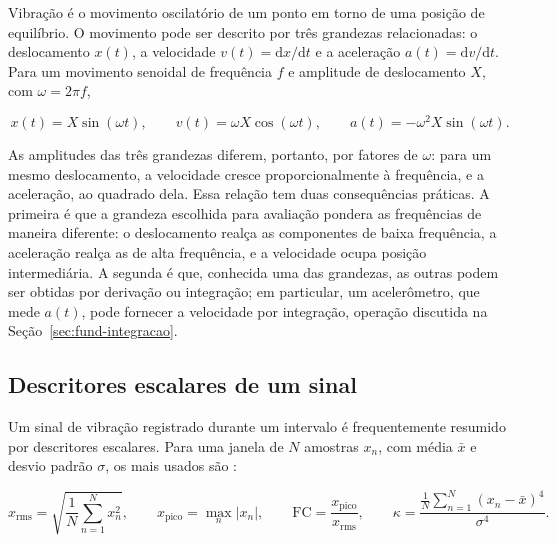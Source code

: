 Vibração é o movimento oscilatório de um ponto em torno de uma posição de equilíbrio. O
movimento pode ser descrito por três grandezas relacionadas: o deslocamento $x(t)$, a
velocidade $v(t) = \mathrm{d}x/\mathrm{d}t$ e a aceleração $a(t) = \mathrm{d}v/\mathrm{d}t$.
Para um movimento senoidal de frequência $f$ e amplitude de deslocamento $X$, com
$\omega = 2\pi f$,

\begin{equation}
x(t) = X \sin(\omega t), \qquad
v(t) = \omega X \cos(\omega t), \qquad
a(t) = -\omega^2 X \sin(\omega t).
\label{eq:fund-senoide}
\end{equation}

As amplitudes das três grandezas diferem, portanto, por fatores de $\omega$: para um mesmo
deslocamento, a velocidade cresce proporcionalmente à frequência, e a aceleração, ao
quadrado dela. Essa relação tem duas consequências práticas. A primeira é que a grandeza
escolhida para avaliação pondera as frequências de maneira diferente: o deslocamento
realça as componentes de baixa frequência, a aceleração realça as de alta frequência, e a
velocidade ocupa posição intermediária. A segunda é que, conhecida uma das grandezas, as
outras podem ser obtidas por derivação ou integração; em particular, um acelerômetro, que
mede $a(t)$, pode fornecer a velocidade por integração, operação discutida na
Seção~\ref{sec:fund-integracao}.

\subsection{Descritores escalares de um sinal}
\label{sec:fund-descritores}

Um sinal de vibração registrado durante um intervalo é frequentemente resumido por
descritores escalares. Para uma janela de $N$ amostras $x_n$, com média $\bar{x}$ e
desvio padrão $\sigma$, os mais usados são \cite{randall2011livro}:

\begin{equation}
x_{\mathrm{rms}} = \sqrt{\frac{1}{N}\sum_{n=1}^{N} x_n^2},
\qquad
x_{\mathrm{pico}} = \max_n |x_n|,
\qquad
\mathrm{FC} = \frac{x_{\mathrm{pico}}}{x_{\mathrm{rms}}},
\qquad
\kappa = \frac{\frac{1}{N}\sum_{n=1}^{N} (x_n-\bar{x})^4}{\sigma^4}.
\label{eq:fund-descritores}
\end{equation}

